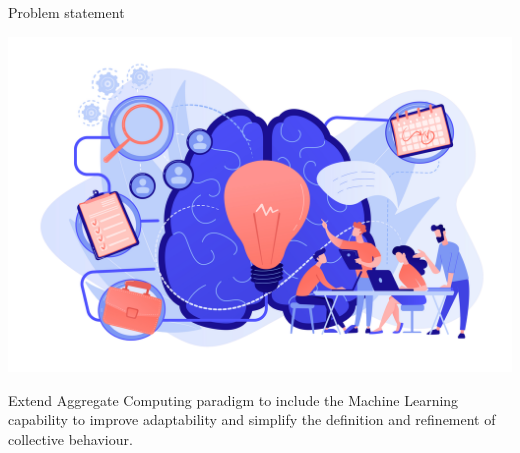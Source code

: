 
\begin{frame}{Problem statement}
  \begin{backgroundblock} 
    \includegraphics[width=\paperwidth]{img/problem-statement.jpg} 
  \end{backgroundblock} 
  \centering
  \begin{card}
    {
      \color{accent}
      Extend Aggregate Computing paradigm to include the Machine Learning capability to improve adaptability and simplify the definition and refinement of collective behaviour.
    }
  \end{card}
\end{frame}